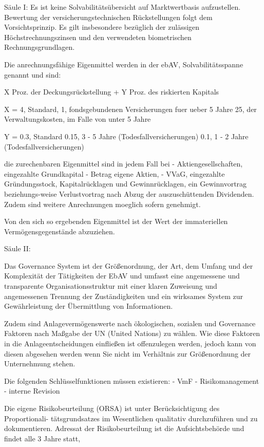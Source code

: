 Säule I:
Es ist keine Solvabilitätsübersicht auf Marktwertbasis aufzustellen.
Bewertung der versicherungstechnischen Rückstellungen folgt dem Vorsichtsprinzip.
Es gilt insbesondere bezüglich der zulässigen Höchstrechnungszinsen und den verwendeten biometrischen Rechnungsgrundlagen.

Die anrechnungsfähige Eigenmittel werden in der ebAV, Solvabilitätsspanne genannt und sind:  

X Proz. der Deckungsrückstellung + Y Proz. des riskierten Kapitals

X = 
4, Standard,
1,  fondsgebundenen Versicherungen fuer ueber 5 Jahre
25, der Verwaltungskosten, im Falle von unter 5 Jahre

Y = 
0.3, Standard
0.15, 3 - 5 Jahre (Todesfallversicherungen)
0.1, 1 - 2 Jahre (Todesfallversicherungen)

die zurechenbaren Eigenmittel sind in jedem Fall bei 
- Aktiengesellschaften, eingezahlte Grundkapital - Betrag eigene Aktien,
- VVaG, eingezahlte Gründungsstock, Kapitalrücklagen und Gewinnrücklagen, ein Gewinnvortrag beziehungs-weise Verlustvortrag 
nach Abzug der auszuschüttenden Dividenden.
Zudem sind weitere Anrechnungen moeglich sofern genehmigt.

Von den sich so ergebenden Eigenmittel ist der Wert der immateriellen Vermögensgegenstände abzuziehen.

Säule II:


Das Governance System ist der Größenordnung, der Art, dem Umfang und der Komplexität der Tätigkeiten der EbAV 
und umfasst eine angemessene und transparente Organisationsstruktur mit einer klaren Zuweisung und 
angemessenen Trennung der Zuständigkeiten und ein wirksames System zur Gewährleistung der Übermittlung von Informationen.

Zudem sind Anlagevermögenswerte nach ökologischen, sozialen und Governance Faktoren nach Maßgabe der UN (United Nations) zu wählen.
Wie diese Faktoren in die Anlageentscheidungen einfließen ist offenzulegen werden, jedoch kann von diesen abgesehen werden
wenn Sie nicht im Verhältnis zur Größenordnung der Unternehmung stehen.

Die folgenden Schlüsselfunktionen müssen existieren:
- VmF
- Risikomanagement
- interne Revision

Die eigene Risikobeurteilung (ORSA) ist unter Berücksichtigung des Proportionali-
tätsgrundsatzes im Wesentlichen qualitativ durchzuführen und zu dokumentieren.
Adressat der Risikobeurteilung ist die Aufsichtsbehörde und findet alle 3 Jahre statt,

